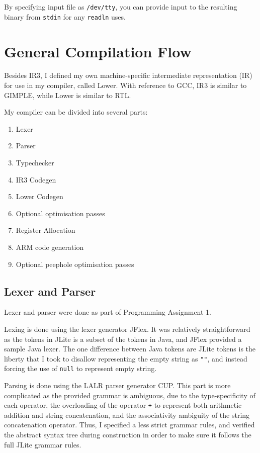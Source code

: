 \documentclass[nonacm, acmsmall, screen, 10pt]{acmart}
\begin{document}
By specifying input file as \texttt{/dev/tty}, you can provide input to the resulting binary from \texttt{stdin} for any \texttt{readln} uses.

\section{General Compilation Flow}
Besides IR3, I defined my own machine-specific intermediate representation (IR) for use in my compiler, called Lower.
With reference to GCC, IR3 is similar to GIMPLE, while Lower is similar to RTL.

My compiler can be divided into several parts:
\begin{enumerate}
  \item Lexer
  \item Parser
  \item Typechecker
  \item IR3 Codegen
  \item Lower Codegen
  \item Optional optimisation passes
  \item Register Allocation
  \item ARM code generation
  \item Optional peephole optimisation passes
\end{enumerate}

\subsection{Lexer and Parser}
Lexer and parser were done as part of Programming Assignment 1.

Lexing is done using the lexer generator JFlex.
It was relatively straightforward as the tokens in JLite is a subset of the tokens in Java, and JFlex provided a sample Java lexer.
The one difference between Java tokens are JLite tokens is the liberty that I took to disallow representing the empty string as \texttt{""}, and instead forcing the use of \texttt{null} to represent empty string.

Parsing is done using the LALR parser generator CUP.
This part is more complicated as the provided grammar is ambiguous, due to the type-specificity of each operator, the overloading of the operator \texttt{+} to represent both arithmetic addition and string concatenation, and the associativity ambiguity of the string concatenation operator.
Thus, I specified a less strict grammar rules, and verified the abstract syntax tree during construction in order to make sure it follows the full JLite grammar rules.
\end{document}
